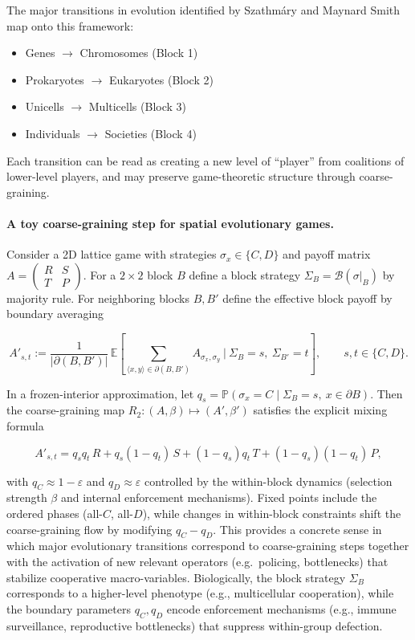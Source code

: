 \documentclass[12pt,a4paper]{article}
\theoremstyle{remark}
\begin{document}
The major transitions in evolution identified by Szathm\'ary and Maynard Smith~\citep{SzathmaryMaynardSmith1995} map onto this framework:

\begin{itemize}
    \item Genes $\to$ Chromosomes (Block 1)
    \item Prokaryotes $\to$ Eukaryotes (Block 2)
    \item Unicells $\to$ Multicells (Block 3)
    \item Individuals $\to$ Societies (Block 4)
\end{itemize}

Each transition can be read as creating a new level of ``player'' from coalitions of lower-level players, and may preserve game-theoretic structure through coarse-graining.

\paragraph{A toy coarse-graining step for spatial evolutionary games.}
Consider a 2D lattice game with strategies $\sigma_x\in\{C,D\}$ and payoff matrix
$A=\begin{pmatrix}R&S\\ T&P\end{pmatrix}$.
For a $2\times 2$ block $B$ define a block strategy $\Sigma_B=\mathcal B(\sigma|_B)$ by majority rule.
For neighboring blocks $B,B'$ define the effective block payoff by boundary averaging

\[
A'_{s,t}
:=\frac{1}{|\partial(B,B')|}\,
\mathbb E\!\left[\sum_{\langle x,y\rangle\in\partial(B,B')} A_{\sigma_x,\sigma_y}\ \Big|\ \Sigma_B=s,\ \Sigma_{B'}=t\right],
\qquad s,t\in\{C,D\}.
\]

In a frozen-interior approximation, let
$q_s=\mathbb P(\sigma_x=C\mid \Sigma_B=s,\ x\in\partial B)$.
Then the coarse-graining map $R_2:(A,\beta)\mapsto(A',\beta')$ satisfies the explicit mixing formula

\[
A'_{s,t}
= q_s q_t\,R + q_s(1-q_t)\,S + (1-q_s)q_t\,T + (1-q_s)(1-q_t)\,P,
\]

with $q_C\approx 1-\varepsilon$ and $q_D\approx \varepsilon$ controlled by the within-block dynamics (selection strength $\beta$ and internal enforcement mechanisms).
Fixed points include the ordered phases (all-$C$, all-$D$), while changes in within-block constraints shift the coarse-graining flow by modifying $q_C-q_D$.
This provides a concrete sense in which major evolutionary transitions correspond to coarse-graining steps together with the activation of new relevant operators (e.g.\ policing, bottlenecks) that stabilize cooperative macro-variables. Biologically, the block strategy $\Sigma_B$ corresponds to a higher-level phenotype (e.g., multicellular cooperation), while the boundary parameters $q_C, q_D$ encode enforcement mechanisms (e.g., immune surveillance, reproductive bottlenecks) that suppress within-group defection.
\end{document}
